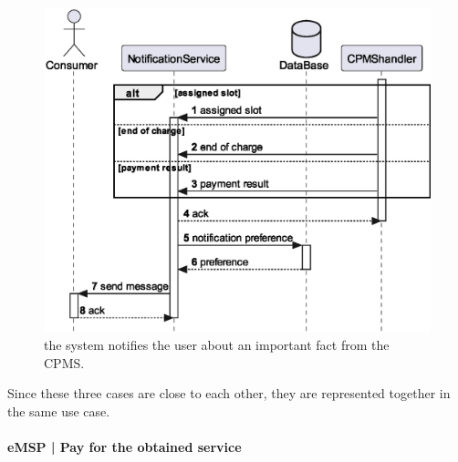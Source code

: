 \begin{figure}[h!]
    \centering
    \includegraphics[width=0.55\columnwidth]{./images/diagrams/sequences/emsp/notification}
    \caption{the system notifies the user about an important fact from the CPMS.}
\end{figure}

Since these three cases are close to each other, they are represented together in the same use case.

\pagebreak

\paragraph{eMSP | Pay for the obtained service}

